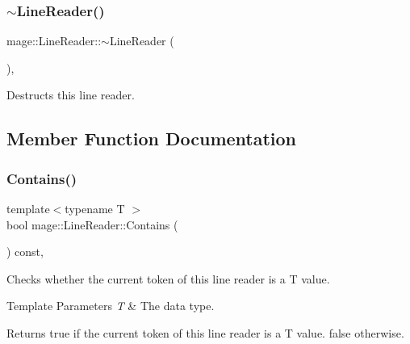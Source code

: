 \subsubsection{\texorpdfstring{$\sim$\+Line\+Reader()}{~LineReader()}}
{\footnotesize\ttfamily mage\+::\+Line\+Reader\+::$\sim$\+Line\+Reader (\begin{DoxyParamCaption}{ }\end{DoxyParamCaption})\hspace{0.3cm}{\ttfamily [protected]}, {\ttfamily [default]}}

Destructs this line reader. 

\subsection{Member Function Documentation}
\mbox{\label{classmage_1_1_line_reader_a89a31254af144fd0c9e7f684cdaa28e7}} 
\subsubsection{\texorpdfstring{Contains()}{Contains()}}
{\footnotesize\ttfamily template$<$typename T $>$ \\
bool mage\+::\+Line\+Reader\+::\+Contains (\begin{DoxyParamCaption}{ }\end{DoxyParamCaption}) const\hspace{0.3cm}{\ttfamily [protected]}, {\ttfamily [noexcept]}}

Checks whether the current token of this line reader is a {\ttfamily T} value.


\begin{DoxyTemplParams}{Template Parameters}
{\em T} & The data type. \\
\hline
\end{DoxyTemplParams}
\begin{DoxyReturn}{Returns}
{\ttfamily true} if the current token of this line reader is a {\ttfamily T} value. {\ttfamily false} otherwise. 
\end{DoxyReturn}
\mbox{\label{classmage_1_1_line_reader_aeb88e4082cfe3ae1ff84a82fcde26298}} 
